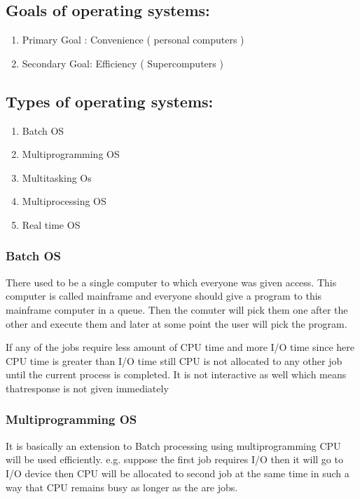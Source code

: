 \documentclass[12pt,letterpaper]{article}
\begin{document}
\subsection{Goals of operating systems: }
\begin{enumerate}
  \item Primary Goal : Convenience ( personal computers )
  \item Secondary Goal: Efficiency ( Supercomputers )
\end{enumerate}

\subsection{Types of operating systems:}
\begin{enumerate}
  \item Batch OS 
  \item Multiprogramming OS
  \item Multitasking Os
  \item Multiprocessing OS
  \item Real time OS
\end{enumerate}

\subsubsection{Batch OS}
There used to be a single computer to which everyone was given access. This computer is called mainframe and everyone should give a program to this mainframe computer in a queue.
Then the comuter will pick them one after the other and execute them and later at some point the user will pick the program.

If any of the jobs require less amount of CPU time  and more I/O time since here CPU time is greater than I/O time still CPU is not allocated to any other job until the current process is completed.
It is not interactive as well which means thatresponse is not given immediately

\subsubsection{Multiprogramming OS}
It is basically an extension to Batch processing using multiprogramming CPU will be used efficiently. e.g. suppose the first job requires I/O then it will go to I/O device then CPU will be allocated to second job at the same time in such a way that CPU remains busy as longer as the are jobs. 
\end{document}
